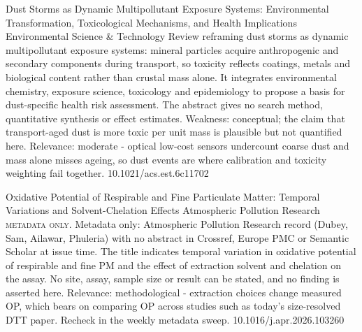 \documentclass[10pt]{article}
\begin{document}
{Dust Storms as Dynamic Multipollutant Exposure Systems: Environmental Transformation, Toxicological Mechanisms, and Health Implications}
{Environmental Science \& Technology}
{Review reframing dust storms as dynamic multipollutant exposure systems: mineral particles acquire anthropogenic and secondary components during transport, so toxicity reflects coatings, metals and biological content rather than crustal mass alone. It integrates environmental chemistry, exposure science, toxicology and epidemiology to propose a basis for dust-specific health risk assessment. The abstract gives no search method, quantitative synthesis or effect estimates. Weakness: conceptual; the claim that transport-aged dust is more toxic per unit mass is plausible but not quantified here. Relevance: moderate - optical low-cost sensors undercount coarse dust and mass alone misses ageing, so dust events are where calibration and toxicity weighting fail together.}
{10.1021/acs.est.6c11702}

{Oxidative Potential of Respirable and Fine Particulate Matter: Temporal Variations and Solvent-Chelation Effects}
{Atmospheric Pollution Research}
{\textsc{metadata only.} Metadata only: Atmospheric Pollution Research record (Dubey, Sam, Ailawar, Phuleria) with no abstract in Crossref, Europe PMC or Semantic Scholar at issue time. The title indicates temporal variation in oxidative potential of respirable and fine PM and the effect of extraction solvent and chelation on the assay. No site, assay, sample size or result can be stated, and no finding is asserted here. Relevance: methodological - extraction choices change measured OP, which bears on comparing OP across studies such as today's size-resolved DTT paper. Recheck in the weekly metadata sweep.}
{10.1016/j.apr.2026.103260}

\par{}\baselineskip{}\baselineskip
{}
\end{document}
